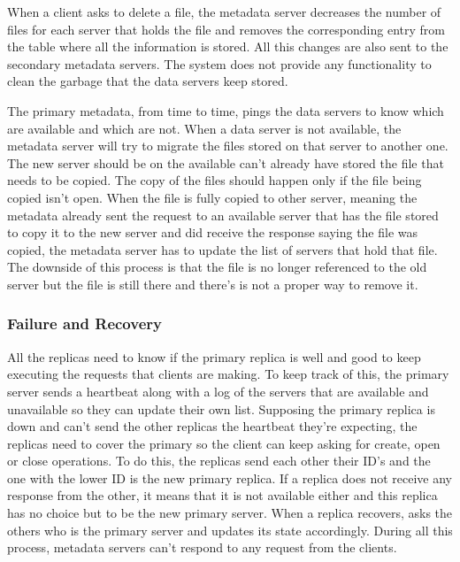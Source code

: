 When a client asks to delete a file, the metadata server decreases the
number of files for each server that holds the file and removes the 
corresponding entry from the table where all the information is stored. 
All this changes are also sent to the secondary metadata servers. 
The system does not provide any functionality to clean the garbage that 
the data servers keep stored.

The primary metadata, from time to time, pings the data servers to know 
which are available and which are not. When a data server is not 
available, the metadata server will try to migrate the files stored on 
that server to another one. The new server should be on the available 
can't already have stored the file that needs to be copied. The 
copy of the files should happen only if the file being copied isn't open. When 
the file is fully copied to other server, meaning the metadata already sent 
the request to an available server that has the file stored to copy it to the new 
server and did receive the response saying the file was copied, the metadata 
server has to update the list of servers that hold that file. The downside 
of this process is that the file is no longer referenced to the old server 
but the file is still there and there's is not a proper way to remove it.

\subsubsection{Failure and Recovery}

All the replicas need to know if the primary replica is well and good to 
keep executing the requests that clients are making. To keep track of this, 
the primary server sends a heartbeat along with a log of the servers that 
are available and unavailable so they can update their own list. Supposing 
the primary replica is down and can't send the other replicas the heartbeat 
they're expecting, the replicas need to cover the primary so the client can 
keep asking for create, open or close operations. To do this, the replicas 
send each other their ID's and the one with the lower ID is the new primary
replica. If a replica does not receive any response from the other, it 
means that it is not available either and this replica has no choice but to 
be the new primary server. When a replica recovers, asks the others who is 
the primary server and updates its state accordingly. During all this process, 
metadata servers can't respond to any request from the clients.
